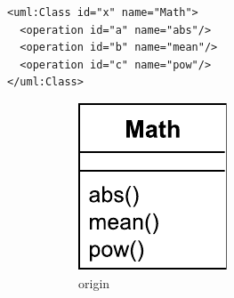 \documentclass{jot}
\begin{document}
\vspace{-15pt}
\begin{minipage}[t]{0.61\linewidth} 
\centering
\begin{lstlisting}[style=eol,caption={The simplified XMI of the model in Fig. \ref{fig:origin}.},label=lst:originxmi]
<uml:Class id="x" name="Math">
  <operation id="a" name="abs"/>
  <operation id="b" name="mean"/>
  <operation id="c" name="pow"/>
</uml:Class>
\end{lstlisting}
\vspace{-10pt}
\begin{figure}[H]
\centering    
\hfill
\begin{subfigure}[t]{0.2\linewidth}
\centering
\includegraphics[width=\linewidth]{OriginalClassDiagram}
\caption{origin}
\label{fig:origin}
\end{subfigure}
\hfill
\begin{subfigure}[t]{0.2\linewidth}
\centering

\end{subfigure}
\end{figure}
\end{minipage}
\end{document}
